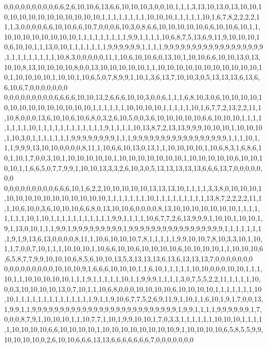 0,0,0,0,0,0,0,0,0,6,6,2,6,10,10,6,13,6,6,10,10,10,3,0,0,10,1,1,1,3,13,10,13,0,13,10,10,10,10,10,10,10,10,10,10,10,10,10,1,1,1,1,1,1,1,1,10,10,10,1,1,1,1,1,10,1,6,7,8,2,2,2,2,11,1,3,0,0,0,0,6,6,10,10,6,6,10,7,0,0,0,6,10,3,0,8,6,6,10,10,10,10,10,6,6,10,10,6,10,1,1,10,10,10,10,10,10,10,10,1,1,1,1,1,1,1,1,1,9,9,1,1,1,1,10,6,8,7,5,13,6,9,11,9,10,10,10,10,6,10,10,1,1,13,0,10,1,1,1,1,1,1,1,9,9,9,9,9,9,1,1,1,1,9,9,9,9,9,9,9,9,9,9,9,9,9,9,9,9,9,9,1,1,1,1,1,1,1,1,1,10,8,3,0,0,0,0,0,11,1,10,6,10,10,6,0,13,10,1,10,10,6,6,10,10,13,0,13,10,10,8,13,10,10,10,10,8,0,0,13,10,10,10,10,10,1,1,10,10,10,10,10,10,10,10,10,10,10,10,1,10,10,10,10,1,10,10,1,10,6,5,0,7,8,9,9,1,10,1,3,6,13,7,10,10,3,0,5,13,13,13,6,13,6,6,10,6,7,0,0,0,0,0,0,0
0,0,0,0,0,0,0,0,0,6,6,6,6,10,10,13,2,6,6,6,10,10,3,0,0,6,1,1,1,6,8,10,3,0,6,10,10,10,10,10,10,10,10,10,10,10,10,10,10,1,1,1,1,1,1,10,10,10,10,1,1,1,1,1,10,1,6,7,7,2,13,2,2,11,1,10,8,0,0,0,13,6,10,10,6,10,6,8,0,3,2,6,10,5,0,0,3,6,10,10,10,10,10,6,6,10,10,10,1,1,1,1,1,1,1,1,10,1,1,1,1,1,1,1,1,1,1,1,1,9,1,1,1,1,10,13,8,7,2,13,13,9,9,9,10,10,10,1,10,10,10,1,10,3,0,1,1,1,1,1,1,1,9,9,9,9,9,9,9,9,1,1,1,9,9,9,9,9,9,9,9,9,9,9,9,9,9,9,9,9,1,1,1,10,1,1,1,9,9,9,13,10,10,0,0,0,0,8,11,1,10,6,6,10,13,0,13,1,1,10,10,10,10,1,10,6,8,3,1,6,8,6,10,1,10,1,7,0,0,3,10,1,10,10,10,10,10,1,10,10,10,10,10,10,10,1,10,10,10,10,10,6,10,10,10,10,1,1,6,6,5,0,7,7,9,9,1,10,10,13,3,3,2,6,10,3,0,5,13,13,13,13,13,6,6,6,13,7,0,0,0,0,0,0,0
0,0,0,0,0,0,0,0,0,6,6,6,10,1,6,2,2,10,10,10,10,10,13,13,13,10,1,1,1,1,3,3,8,0,10,10,10,1,10,10,10,10,10,10,10,10,10,10,10,1,1,1,1,1,1,1,10,1,1,1,1,1,1,1,1,1,13,8,7,2,2,2,2,11,1,1,10,6,10,0,3,6,10,10,10,6,6,8,0,13,10,10,6,0,0,0,0,8,13,10,10,10,10,10,10,10,1,1,1,1,1,1,1,1,10,1,10,1,1,1,1,1,1,1,1,1,1,1,9,9,1,1,1,1,10,6,7,7,2,6,13,9,9,9,1,10,10,1,10,10,1,9,1,13,0,10,1,1,1,9,9,1,9,9,9,9,9,9,9,9,9,1,9,9,9,9,9,9,9,9,9,9,9,9,9,9,9,9,9,1,1,1,1,1,1,1,1,9,1,9,13,6,13,0,0,0,0,8,11,1,10,6,10,10,10,7,8,1,1,1,1,1,9,9,10,10,7,8,10,3,3,10,1,10,1,1,7,0,0,7,10,1,1,1,10,10,10,1,10,6,6,10,10,6,10,10,10,10,6,10,10,10,10,1,1,10,10,10,6,6,5,8,7,7,9,9,10,10,10,6,8,5,6,10,10,13,5,3,13,13,13,6,13,6,13,13,13,7,0,0,0,0,0,0,0
0,0,0,0,0,0,0,0,0,10,10,10,9,1,6,6,6,10,10,10,1,1,6,10,1,1,1,1,1,10,10,0,0,0,10,10,1,1,1,10,1,1,10,10,10,10,10,1,1,1,9,1,1,1,1,1,10,1,1,9,9,9,1,1,1,1,3,0,7,5,5,2,2,11,1,1,1,1,10,0,0,3,10,10,10,10,13,0,7,10,1,1,10,6,8,0,0,0,10,10,10,10,6,10,10,10,10,1,1,1,1,1,1,1,10,10,1,1,1,1,1,1,1,1,1,1,1,1,1,1,9,1,1,9,10,6,7,7,5,2,6,9,11,9,1,10,1,1,6,10,1,9,1,7,0,0,13,1,9,9,1,1,9,9,9,9,9,9,9,9,9,9,9,9,9,9,9,9,9,9,9,9,9,9,9,9,9,9,1,9,9,1,1,1,1,9,9,9,9,9,9,1,7,0,0,0,8,7,9,1,10,10,10,1,1,10,7,7,1,10,1,9,9,10,10,1,7,0,3,3,1,1,1,1,1,1,10,10,10,1,1,1,1,1,10,10,10,10,6,6,10,10,10,10,1,10,10,10,10,10,10,10,10,9,1,10,10,10,10,6,5,8,5,5,9,9,10,10,10,10,0,2,6,10,10,6,6,6,13,13,6,6,6,6,6,6,6,7,0,0,0,0,0,0,0
